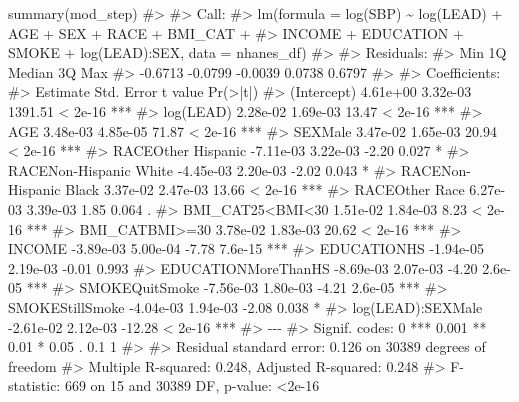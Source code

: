 \documentclass[
  letterpaper,
]{latex/krantz}
\makeatletter
\newenvironment{Shaded}{\begin{snugshade}}{\end{snugshade}}
\newcommand{\CommentTok}[1]{\textcolor[rgb]{0.37,0.37,0.37}{#1}}
\newcommand{\FunctionTok}[1]{\textcolor[rgb]{0.28,0.35,0.67}{#1}}
\newcommand{\NormalTok}[1]{\textcolor[rgb]{0.00,0.23,0.31}{#1}}
\newenvironment{kframe}{%
\medskip{}
\setlength{\fboxsep}{.8em}
 \def\at@end@of@kframe{}%
 \ifinner\ifhmode%
  \def\at@end@of@kframe{\end{minipage}}%
  \begin{minipage}{\columnwidth}%
 \fi\fi%
 \def\FrameCommand##1{\hskip\@totalleftmargin \hskip-\fboxsep
 \colorbox{shadecolor}{##1}\hskip-\fboxsep
     \hskip-\linewidth \hskip-\@totalleftmargin \hskip\columnwidth}%
 \MakeFramed {\advance\hsize-\width
   \@totalleftmargin\z@ \linewidth\hsize
   \@setminipage}}%
 {\par\unskip\endMakeFramed%
 \at@end@of@kframe}
\renewenvironment{Shaded}{\begin{kframe}}{\end{kframe}}
\makeatother
\begin{document}
\begin{Shaded}
\begin{Highlighting}[]
\FunctionTok{summary}\NormalTok{(mod\_step)}
\CommentTok{\#\textgreater{} }
\CommentTok{\#\textgreater{} Call:}
\CommentTok{\#\textgreater{} lm(formula = log(SBP) \textasciitilde{} log(LEAD) + AGE + SEX + RACE + BMI\_CAT + }
\CommentTok{\#\textgreater{}     INCOME + EDUCATION + SMOKE + log(LEAD):SEX, data = nhanes\_df)}
\CommentTok{\#\textgreater{} }
\CommentTok{\#\textgreater{} Residuals:}
\CommentTok{\#\textgreater{}     Min      1Q  Median      3Q     Max }
\CommentTok{\#\textgreater{} {-}0.6713 {-}0.0799 {-}0.0039  0.0738  0.6797 }
\CommentTok{\#\textgreater{} }
\CommentTok{\#\textgreater{} Coefficients:}
\CommentTok{\#\textgreater{}                         Estimate Std. Error t value Pr(\textgreater{}|t|)    }
\CommentTok{\#\textgreater{} (Intercept)             4.61e+00   3.32e{-}03 1391.51  \textless{} 2e{-}16 ***}
\CommentTok{\#\textgreater{} log(LEAD)               2.28e{-}02   1.69e{-}03   13.47  \textless{} 2e{-}16 ***}
\CommentTok{\#\textgreater{} AGE                     3.48e{-}03   4.85e{-}05   71.87  \textless{} 2e{-}16 ***}
\CommentTok{\#\textgreater{} SEXMale                 3.47e{-}02   1.65e{-}03   20.94  \textless{} 2e{-}16 ***}
\CommentTok{\#\textgreater{} RACEOther Hispanic     {-}7.11e{-}03   3.22e{-}03   {-}2.20    0.027 *  }
\CommentTok{\#\textgreater{} RACENon{-}Hispanic White {-}4.45e{-}03   2.20e{-}03   {-}2.02    0.043 *  }
\CommentTok{\#\textgreater{} RACENon{-}Hispanic Black  3.37e{-}02   2.47e{-}03   13.66  \textless{} 2e{-}16 ***}
\CommentTok{\#\textgreater{} RACEOther Race          6.27e{-}03   3.39e{-}03    1.85    0.064 .  }
\CommentTok{\#\textgreater{} BMI\_CAT25\textless{}BMI\textless{}30        1.51e{-}02   1.84e{-}03    8.23  \textless{} 2e{-}16 ***}
\CommentTok{\#\textgreater{} BMI\_CATBMI\textgreater{}=30          3.78e{-}02   1.83e{-}03   20.62  \textless{} 2e{-}16 ***}
\CommentTok{\#\textgreater{} INCOME                 {-}3.89e{-}03   5.00e{-}04   {-}7.78  7.6e{-}15 ***}
\CommentTok{\#\textgreater{} EDUCATIONHS            {-}1.94e{-}05   2.19e{-}03   {-}0.01    0.993    }
\CommentTok{\#\textgreater{} EDUCATIONMoreThanHS    {-}8.69e{-}03   2.07e{-}03   {-}4.20  2.6e{-}05 ***}
\CommentTok{\#\textgreater{} SMOKEQuitSmoke         {-}7.56e{-}03   1.80e{-}03   {-}4.21  2.6e{-}05 ***}
\CommentTok{\#\textgreater{} SMOKEStillSmoke        {-}4.04e{-}03   1.94e{-}03   {-}2.08    0.038 *  }
\CommentTok{\#\textgreater{} log(LEAD):SEXMale      {-}2.61e{-}02   2.12e{-}03  {-}12.28  \textless{} 2e{-}16 ***}
\CommentTok{\#\textgreater{} {-}{-}{-}}
\CommentTok{\#\textgreater{} Signif. codes:  0 \textquotesingle{}***\textquotesingle{} 0.001 \textquotesingle{}**\textquotesingle{} 0.01 \textquotesingle{}*\textquotesingle{} 0.05 \textquotesingle{}.\textquotesingle{} 0.1 \textquotesingle{} \textquotesingle{} 1}
\CommentTok{\#\textgreater{} }
\CommentTok{\#\textgreater{} Residual standard error: 0.126 on 30389 degrees of freedom}
\CommentTok{\#\textgreater{} Multiple R{-}squared:  0.248,  Adjusted R{-}squared:  0.248 }
\CommentTok{\#\textgreater{} F{-}statistic:  669 on 15 and 30389 DF,  p{-}value: \textless{}2e{-}16}
\end{Highlighting}
\end{Shaded}
\end{document}
